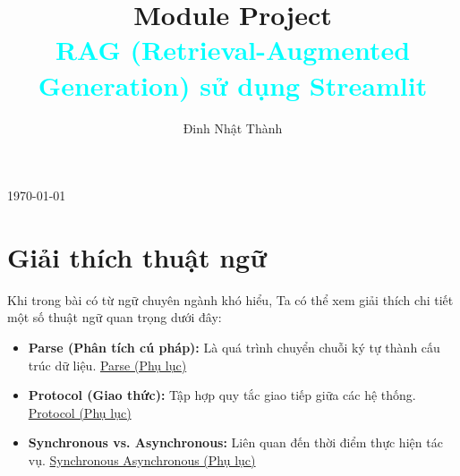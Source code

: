 \documentclass[11pt]{article}
\title{{Module Project}\\[0.5em]\textcolor{cyan}{RAG (Retrieval-Augmented Generation) sử dụng Streamlit}}
\author{Đinh Nhật Thành}
\date{}
\renewcommand{\maketitle}{}
\begin{document}
\maketitle

\begin{titlepage}
    \centering
    \vspace*{\fill}

    {\Huge \textbf{\thetitle} \par}
    \vspace{2em}

    {\Large \textbf{\theauthor} \par}
    \vspace{1em}

    {\large \today \par}

    \vspace*{\fill}
    \thispagestyle{fancy}
\end{titlepage}

\newpage
\tableofcontents
\thispagestyle{fancy}

\setlength{\parindent}{2em} %


\newpage

\renewcommand{\thesubsection}{\arabic{subsection}}
\newpage

\section{Giải thích thuật ngữ}
Khi trong bài có từ ngữ chuyên ngành khó hiểu, Ta có thể xem giải thích chi tiết một số thuật ngữ quan trọng dưới đây:

\begin{itemize}
    \item \textbf{Parse (Phân tích cú pháp):}
    Là quá trình chuyển chuỗi ký tự thành cấu trúc dữ liệu. \hyperref[app:parse]{Parse (Phụ lục)}

    \item \textbf{Protocol (Giao thức):}
    Tập hợp quy tắc giao tiếp giữa các hệ thống. \hyperref[app:protocol]{Protocol (Phụ lục)}

    \item \textbf{Synchronous vs. Asynchronous:}
    Liên quan đến thời điểm thực hiện tác vụ. \hyperref[app:synchronous_asynchronous]{Synchronous Asynchronous (Phụ lục)}
\end{itemize}
\end{document}
